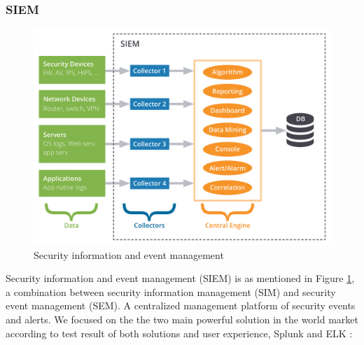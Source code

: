 \subsubsection{ SIEM }
\begin{figure}[!htpb] 
\begin{center}
\includegraphics[height=3.0 in]{images/ATHENAsiem.png}
\end{center}
\caption{ Security information and event management }
\label{siem}
\end{figure}
Security information and event management (SIEM) is as mentioned in Figure \ref{siem}, a combination between security information management (SIM) and security event management (SEM). A centralized management platform of security events and alerts.
We focused on the the two main powerful solution in the world market according to test result of both solutions and user experience, Splunk and ELK :

